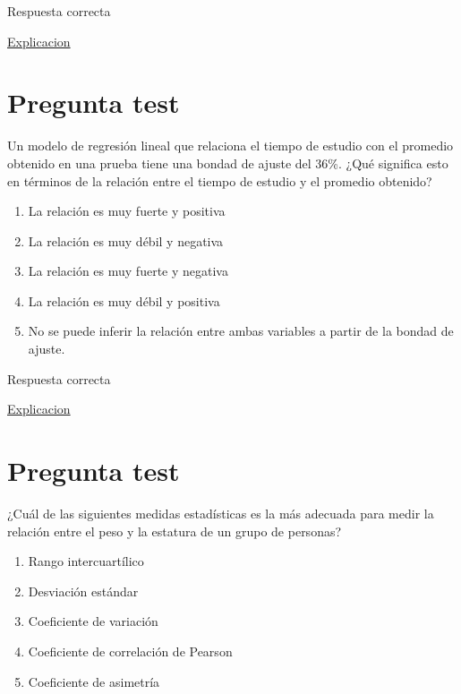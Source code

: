 \documentclass[
]{book}
\providecommand{\tightlist}{%
  \setlength{\itemsep}{0pt}\setlength{\parskip}{0pt}}
\begin{document}
Respuesta correcta

\href{https://1fjmanzano.github.io/bioestadistica/relaci\%C3\%B3n-entre-variables-nume\%CC\%81ricas.html\#regresio\%CC\%81n-lineal}{Explicacion}

\hypertarget{pregunta-test-149}{%
\section{Pregunta test}\label{pregunta-test-149}}

Un modelo de regresión lineal que relaciona el tiempo de estudio con el promedio obtenido en una prueba tiene una bondad de ajuste del 36\%. ¿Qué significa esto en términos de la relación entre el tiempo de estudio y el promedio obtenido?

\begin{enumerate}
\def\labelenumi{\alph{enumi})}
\tightlist
\item
  La relación es muy fuerte y positiva
\item
  La relación es muy débil y negativa
\item
  La relación es muy fuerte y negativa
\item
  La relación es muy débil y positiva
\item
  No se puede inferir la relación entre ambas variables a partir de la bondad de ajuste.
\end{enumerate}

Respuesta correcta

\href{https://blog.minitab.com/es/analisis-de-regresion-como-puedo-interpretar-el-r-cuadrado-y-evaluar-la-bondad-de-ajuste}{Explicacion}

\hypertarget{pregunta-test-150}{%
\section{Pregunta test}\label{pregunta-test-150}}

¿Cuál de las siguientes medidas estadísticas es la más adecuada para medir la relación entre el peso y la estatura de un grupo de personas?

\begin{enumerate}
\def\labelenumi{\alph{enumi})}
\tightlist
\item
  Rango intercuartílico
\item
  Desviación estándar
\item
  Coeficiente de variación
\item
  Coeficiente de correlación de Pearson
\item
  Coeficiente de asimetría
\end{enumerate}
\end{document}
